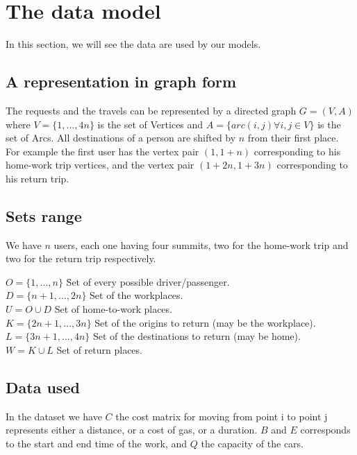 \documentclass[12pt, a4paper, twoside]{memoir}
\newcommand\tab[1][1cm]{\hspace*{#1}}
\begin{document}
{	%
	\section{The data model}
	In this section, we will see the data are used by our models.
	
	\subsection{A representation in graph form}
	The requests and the travels can be represented by a directed graph $G=(V, A)$ where $V=\{1, ..., 4n\}$ is the set of Vertices and $A=\{arc(i, j) \forall i, j \in V\}$ is the set of Arcs. \newline
	All destinations of a person are shifted by $n$ from their first place. \newline
	For example the first user has the vertex pair $(1, 1+n)$ corresponding to his home-work trip vertices, and the vertex pair $(1+2n, 1+3n)$ corresponding to his return trip.

	\subsection{Sets range} 
	
	We have $n$ users, each one having four summits, two for the home-work trip and two for the return trip respectively. 
	
	\begin{tabbing}
		$O=\{1, ..., n\}$ \tab \tab \= Set of every possible driver/passenger. \\
		$D=\{n+1, ..., 2n\}$ \> Set of the workplaces. \\
		$U=O\cup D$ \> Set of home-to-work places. \\
	
		$K=\{2n+1, ..., 3n\}$ \> Set of the origins to return (may be the workplace). \\
		$L=\{3n+1, ..., 4n\}$ \> Set of the destinations to return (may be home). \\
		$W=K\cup L$ \> Set of return places. \\
	\end{tabbing}
	
	\subsection{Data used}
	In the dataset we have $C$ the cost matrix for moving from point i to point j represents either a distance, or a cost of gas, or a duration. $B$ and $E$ corresponds to the start and end time of the work, and $Q$ the capacity of the cars.
	
}
\end{document}
